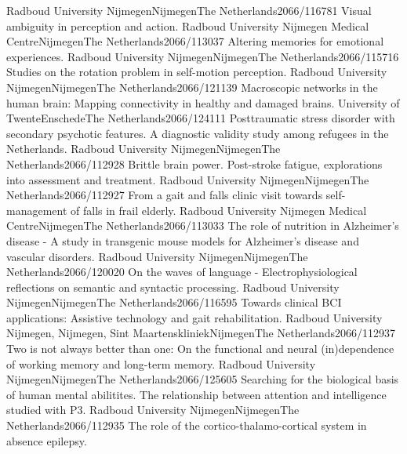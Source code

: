 	{Radboud University Nijmegen}{Nijmegen}{The Netherlands}{2066/116781}
	{Visual ambiguity in perception and action.}
	{Radboud University Nijmegen Medical Centre}{Nijmegen}{The Netherlands}{2066/113037}
	{Altering memories for emotional experiences.}
	{Radboud University Nijmegen}{Nijmegen}{The Netherlands}{2066/115716}
	{ Studies on the rotation problem in self-motion perception.}
	{Radboud University Nijmegen}{Nijmegen}{The Netherlands}{2066/121139}
	{ Macroscopic networks in the human brain: Mapping connectivity in healthy and damaged brains.}
	{University of Twente}{Enschede}{The Netherlands}{2066/124111}
	{Posttraumatic stress disorder with secondary psychotic features. A diagnostic validity study among refugees in the Netherlands.}
	{Radboud University Nijmegen}{Nijmegen}{The Netherlands}{2066/112928}
	{Brittle brain power. Post-stroke fatigue, explorations into assessment and treatment.}
	{Radboud University Nijmegen}{Nijmegen}{The Netherlands}{2066/112927}
	{From a gait and falls clinic visit towards self-management of falls in frail elderly.}
	{Radboud University Nijmegen Medical Centre}{Nijmegen}{The Netherlands}{2066/113033}
	{The role of nutrition in Alzheimer's disease - A study in transgenic mouse models for Alzheimer's disease and vascular disorders.}
	{Radboud University Nijmegen}{Nijmegen}{The Netherlands}{2066/120020}
	{On the waves of language - Electrophysiological reflections on semantic and syntactic processing.}
	{Radboud University Nijmegen}{Nijmegen}{The Netherlands}{2066/116595}
	{Towards clinical BCI applications: Assistive technology and gait rehabilitation.}
	{Radboud University Nijmegen, Nijmegen, Sint Maartenskliniek}{Nijmegen}{The Netherlands}{2066/112937}
	{Two is not always better than one: On the functional and neural (in)dependence of working memory and long-term memory.}
	{Radboud University Nijmegen}{Nijmegen}{The Netherlands}{2066/125605}
	{Searching for the biological basis of human mental abilitites. The relationship between attention and intelligence studied with P3.}
	{Radboud University Nijmegen}{Nijmegen}{The Netherlands}{2066/112935}
	{The role of the cortico-thalamo-cortical system in absence epilepsy.}
